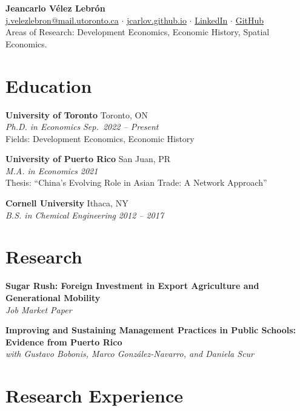 \documentclass[11pt,letterpaper]{article}
\begin{document}
\begin{center}
  {\LARGE\bfseries Jeancarlo V\'elez Lebr\'on} \\[4pt]
  \href{mailto:j.velezlebron@mail.utoronto.ca}{j.velezlebron@mail.utoronto.ca} $\cdot$
  \href{https://jcarlov.github.io}{jcarlov.github.io} $\cdot$
  \href{https://www.linkedin.com/in/jeancarlo-velez}{LinkedIn} $\cdot$
  \href{https://github.com/jcarlov}{GitHub} \\[2pt]
  Areas of Research: Development Economics, Economic History, Spatial Economics.
\end{center}

\section{Education}

\textbf{University of Toronto} \hfill Toronto, ON \\
\textit{Ph.D. in Economics} \hfill \textit{Sep.\ 2022 -- Present} \\[1pt]
\quad Fields: Development Economics, Economic History

\smallskip

\textbf{University of Puerto Rico} \hfill San Juan, PR \\
\textit{M.A. in Economics} \hfill \textit{2021} \\[1pt]
\quad Thesis: ``China's Evolving Role in Asian Trade: A Network Approach''

\smallskip

\textbf{Cornell University} \hfill Ithaca, NY \\
\textit{B.S. in Chemical Engineering} \hfill \textit{2012 -- 2017}

\section{Research}

\textbf{Sugar Rush: Foreign Investment in Export Agriculture and Generational Mobility} \\
\textit{Job Market Paper}

\smallskip

\textbf{Improving and Sustaining Management Practices in Public Schools: Evidence from Puerto Rico} \\
\textit{with Gustavo Bobonis, Marco Gonz\'alez-Navarro, and Daniela Scur}

\section{Research Experience}
\end{document}

